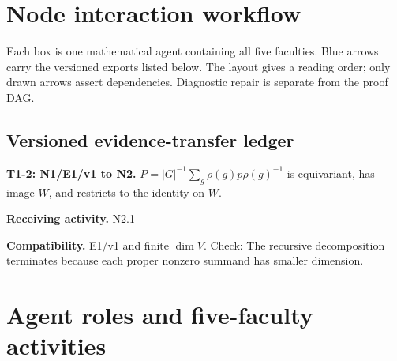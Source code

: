 \documentclass[preprint,12pt,aps,pra,showkeys,amsmath,amssymb,superscriptaddress,floatfix]{revtex4-2}
\theoremstyle{definition}
\theoremstyle{remark}
\newcommand{\field}[2]{\par\smallskip\noindent\textbf{#1.} #2\par}
\begin{document}
\clearpage\section{Node interaction workflow}

\begin{center}\end{center}

Each box is one mathematical agent containing all five faculties. Blue
arrows carry the versioned exports listed below. The layout gives a
reading order; only drawn arrows assert dependencies. Diagnostic repair
is separate from the proof DAG.

\subsection{Versioned evidence-transfer ledger}

\begingroup\small\linespread{1.05}\selectfont

\field{T1-2: N1/E1/v1 to N2}{\(P=|G|^{-1}\sum_g\rho(g)p\rho(g)^{-1}\) is equivariant, has image
\(W\), and restricts to the identity on \(W\).}

\field{Receiving activity}{N2.1}

\field{Compatibility}{E1/v1 and finite \(\dim V\). Check: The recursive decomposition
terminates because each proper nonzero summand has smaller dimension.}

\endgroup

\clearpage\section{Agent roles and five-faculty activities}\begingroup\small\linespread{1.05}\selectfont{}
\end{document}
